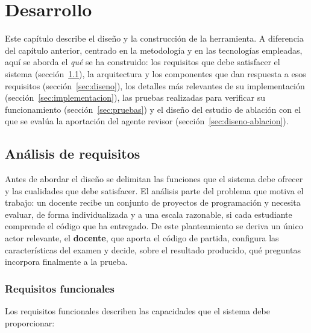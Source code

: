 \chapter{Desarrollo}
\label{cap:desarrollo}

Este capítulo describe el diseño y la construcción de la herramienta. A
diferencia del capítulo anterior, centrado en la metodología y en las
tecnologías empleadas, aquí se aborda el \emph{qué} se ha construido: los
requisitos que debe satisfacer el sistema (sección~\ref{sec:analisis-requisitos}),
la arquitectura y los componentes que dan respuesta a esos requisitos
(sección~\ref{sec:diseno}), los detalles más relevantes de su
implementación (sección~\ref{sec:implementacion}), las pruebas
realizadas para verificar su funcionamiento (sección~\ref{sec:pruebas}) y el
diseño del estudio de ablación con el que se evalúa la aportación del agente
revisor (sección~\ref{sec:diseno-ablacion}).


\section{Análisis de requisitos}
\label{sec:analisis-requisitos}

Antes de abordar el diseño se delimitan las funciones que el sistema debe
ofrecer y las cualidades que debe satisfacer. El análisis parte del
problema que motiva el trabajo: un docente recibe un conjunto de
proyectos de programación y necesita evaluar, de forma individualizada y
a una escala razonable, si cada estudiante comprende el código que ha
entregado. De este planteamiento se deriva un único actor relevante, el
\textbf{docente}, que aporta el código de partida, configura las
características del examen y decide, sobre el resultado producido, qué
preguntas incorpora finalmente a la prueba.

\subsection{Requisitos funcionales}
\label{sec:requisitos-funcionales}

Los requisitos funcionales describen las capacidades que el sistema debe
proporcionar:

